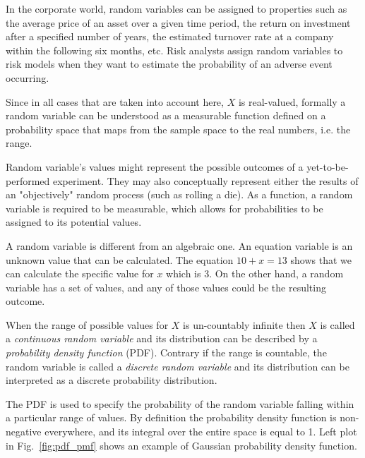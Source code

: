 In the corporate world, random variables can be assigned to properties such as the average price of an asset over a given time period, the return on investment after a specified number of years, the estimated turnover rate at a company within the following six months, etc. Risk analysts assign random variables to risk models when they want to estimate the probability of an adverse event occurring. 


Since in all cases that are taken into account here, $X$ is real-valued, formally a random variable can be understood as a measurable function defined on a probability space that maps from the sample space to the real numbers, i.e. the range.
%

Random variable's values might represent the possible outcomes of a yet-to-be-performed experiment. They may also conceptually represent either the results of an "objectively" random process (such as rolling a die). As a function, a random variable is required to be measurable, which allows for probabilities to be assigned to its potential values. 

A random variable is different from an algebraic one. An equation variable is an unknown value that can be calculated. The equation $10 + x = 13$ shows that we can calculate the specific value for $x$ which is 3. On the other hand, a random variable has a set of values, and any of those values could be the resulting outcome.

When the range of possible values for $X$ is un-countably infinite then $X$ is called a \emph{continuous random variable} and its distribution can be described by a \emph{probability density function} (PDF). Contrary if the range is countable, the random variable is called a \emph{discrete random variable} and its distribution can be interpreted as a discrete probability distribution.

The PDF is used to specify the probability of the random variable falling within a particular range of values. By definition 
the probability density function is non-negative everywhere, and its integral over the entire space is equal to 1.
Left plot in Fig.~\ref{fig:pdf_pmf} shows an example of Gaussian probability density function.

